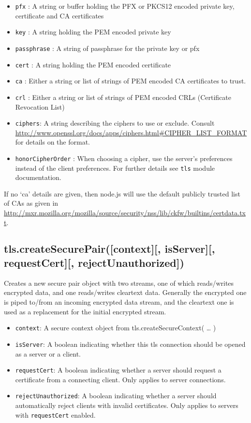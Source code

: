 \begin{itemize}
\itemsep1pt\parskip0pt
\item
  \texttt{pfx} : A string or buffer holding the PFX or PKCS12 encoded
  private key, certificate and CA certificates
\item
  \texttt{key} : A string holding the PEM encoded private key
\item
  \texttt{passphrase} : A string of passphrase for the private key or
  pfx
\item
  \texttt{cert} : A string holding the PEM encoded certificate
\item
  \texttt{ca} : Either a string or list of strings of PEM encoded CA
  certificates to trust.
\item
  \texttt{crl} : Either a string or list of strings of PEM encoded CRLs
  (Certificate Revocation List)
\item
  \texttt{ciphers}: A string describing the ciphers to use or exclude.
  Consult
  \url{http://www.openssl.org/docs/apps/ciphers.html\#CIPHER_LIST_FORMAT}
  for details on the format.
\item
  \texttt{honorCipherOrder} : When choosing a cipher, use the server's
  preferences instead of the client preferences. For further details see
  \texttt{tls} module documentation.
\end{itemize}

If no `ca' details are given, then node.js will use the default publicly
trusted list of CAs as given in
\url{http://mxr.mozilla.org/mozilla/source/security/nss/lib/ckfw/builtins/certdata.txt}.

\subsection{tls.createSecurePair({[}context{]}{[}, isServer{]}{[},
requestCert{]}{[},
rejectUnauthorized{]})}\label{tls.createsecurepaircontext-isserver-requestcert-rejectunauthorized}

Creates a new secure pair object with two streams, one of which
reads/writes encrypted data, and one reads/writes cleartext data.
Generally the encrypted one is piped to/from an incoming encrypted data
stream, and the cleartext one is used as a replacement for the initial
encrypted stream.

\begin{itemize}
\item
  \texttt{context}: A secure context object from
  tls.createSecureContext( \ldots{} )
\item
  \texttt{isServer}: A boolean indicating whether this tls connection
  should be opened as a server or a client.
\item
  \texttt{requestCert}: A boolean indicating whether a server should
  request a certificate from a connecting client. Only applies to server
  connections.
\item
  \texttt{rejectUnauthorized}: A boolean indicating whether a server
  should automatically reject clients with invalid certificates. Only
  applies to servers with \texttt{requestCert} enabled.
\end{itemize}

